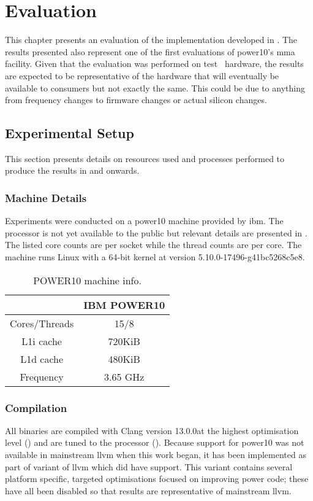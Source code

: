 \documentclass[\main/thesis.tex]{subfiles}
\begin{document}
\chapter{Evaluation}
\label{cha:evaluation}
This chapter presents an evaluation of the implementation developed in .
The results presented also represent one of the first evaluations of \gls{power10}'s \gls{mma} facility.
Given that the evaluation was performed on test~ hardware, the results are expected to be representative of the hardware that will eventually be available to consumers but not exactly the same.
This could be due to anything from frequency changes to firmware changes or actual silicon changes.

\section{Experimental Setup}
This section presents details on resources used and processes performed to produce the results in  and onwards.

\subsection{Machine Details}
Experiments were conducted on a \gls{power10} machine provided by \gls{ibm}.
The processor is not yet available to the public but relevant details are presented in .
The listed core counts are per socket while the thread counts are per core.
The machine runs Linux with a 64-bit kernel at version 5.10.0-17496-g41bc5268c5e8.

\begin{table}[t]
  \centering
  \begin{tabular}{c | c}
    & IBM POWER10\\\hline
    Cores/Threads & 15/8\\
    L1i cache & 720KiB\\
    L1d cache & 480KiB\\
    Frequency & 3.65 GHz\\
  \end{tabular}
  \caption{POWER10 machine info.}
  \label{tab:machineInfo}
\end{table}

\subsection{Compilation}
All binaries are compiled with Clang version 13.0.0\footnotemark at the highest optimisation level () and are tuned to the processor ().
Because support for \gls{power10} was not available in mainstream \gls{llvm} when this work began, it has been implemented as part of  variant of \gls{llvm} which did have support.
This variant contains several platform specific, targeted optimisations focused on improving \gls{power} code; these have all been disabled so that results are representative of mainstream \gls{llvm}.
\end{document}
